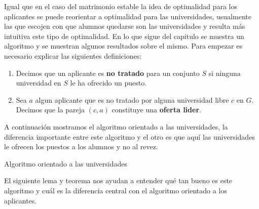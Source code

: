Igual que en el caso del matrimonio estable la idea de optimalidad para los aplicantes se puede reorientar a optimalidad para las universidades, usualmente las que escojen con que alumnos quedarse son las universidades y resulta más intuitiva este tipo de optimalidad. En lo que sigue del capitulo se muestra un algoritmo y se muestran algunos resultados sobre el mismo. Para empezar es necesario explicar las siguientes definiciones:
\begin{enumerate}
\item Decimos que un aplicante es \textbf{no tratado} para un conjunto $S$ si ninguna universidad en $S$ le ha ofrecido un puesto.
\item Sea $a$ algun aplicante que es no tratado por alguna universidad libre $c$ en $G$. Decimos que la pareja $(c,a)$ constituye una \textbf{oferta lider}.
\end{enumerate}

A continuación mostramos el algoritmo orientado a las universidades, la diferencia importante entre este algoritmo y el otro es que aquí las universidades le ofrecen los puestos a los alumnos y no al revez.

\IncMargin{1em}
\begin{Algoritmo}[H]

\BlankLine
{}
\caption{Algoritmo orientado a las universidades}
\end{Algoritmo}
\DecMargin{1em}

El siguiente lema y teorema nos ayudan a entender qué tan bueno es este algoritmo y cuál es la diferencia central con el algoritmo orientado a los aplicantes. 


